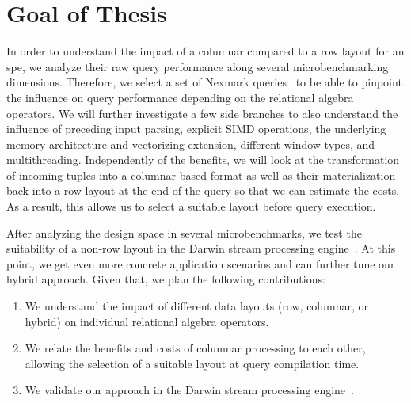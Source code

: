 \section{Goal of Thesis}
\label{sec:goal}

In order to understand the impact of a columnar compared to a row layout for an \ac{spe}, we analyze their raw query performance along several microbenchmarking dimensions.
Therefore, we select a set of Nexmark queries~\cite{tucker2008nexmark} to be able to pinpoint the influence on query performance depending on the relational algebra operators.
We will further investigate a few side branches to also understand the influence of preceding input parsing, explicit SIMD operations, the underlying memory architecture and vectorizing extension, different window types, and multithreading. 
Independently of the benefits, we will look at the transformation of incoming tuples into a columnar-based format as well as their materialization back into a row layout at the end of the query so that we can estimate the costs.
As a result, this allows us to select a suitable layout before query execution.

After analyzing the design space in several microbenchmarks, we test the suitability of a non-row layout in the Darwin stream processing engine~\cite{DBLP:conf/cidr/BensonR22}.
At this point, we get even more concrete application scenarios and can further tune our hybrid approach. 
Given that, we plan the following contributions:
\begin{enumerate}
    \item We understand the impact of different data layouts (row, columnar, or hybrid) on individual relational algebra operators.
    \item We relate the benefits and costs of columnar processing to each other, allowing the selection of a suitable layout at query compilation time.
    \item We validate our approach in the Darwin stream processing engine~\cite[]{DBLP:conf/cidr/BensonR22}.
\end{enumerate}